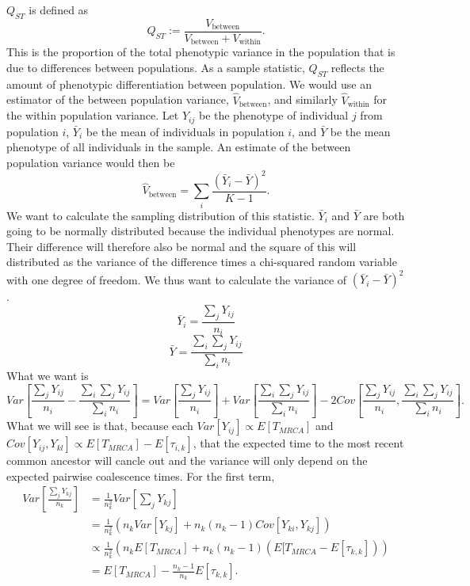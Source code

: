 $Q_{ST}$ is defined as 
\begin{equation}
  \label{eq:qst}
  Q_{ST} := \frac{V_{\text{between}}}{V_{\text{between}} + V_{\text{within}}}.
\end{equation}
This is the proportion of the total phenotypic variance in the population that is due to differences between
populations. As a sample statistic, $Q_{ST}$ reflects the amount of phenotypic differentiation between population. We
would use an estimator of the between population variance, $\hat{V}_{\text{between}}$, and similarly
$\hat{V}_{\text{within}}$ for the within population variance. Let $Y_{ij}$ be the phenotype of individual $j$ from
population $i$, $\bar{Y}_i$ be the mean of individuals in population $i$, and $\bar{Y}$ be the mean phenotype of all
individuals in the sample. An estimate of the between population variance would then be
\begin{equation}
  \label{eq:between}
  \hat{V}_{\text{between}} = \sum_i \frac{(\bar{Y}_i-\bar{Y})^2}{K-1}.
\end{equation}
We want to calculate the sampling distribution of this statistic. $\bar{Y}_i$ and $\bar{Y}$ are both going to be
normally distributed because the individual phenotypes are normal. Their difference will therefore also be normal and
the square of this will distributed as the variance of the difference times a chi-squared random variable with one
degree of freedom. We thus want to calculate the variance of $(\bar{Y}_i-\bar{Y})^2$. 
\begin{equation}
  \label{eq:popmean}
  \bar{Y}_i = \frac{\sum_jY_{ij}}{n_i}
\end{equation}
\begin{equation}
  \label{eq:grandmean}
  \bar{Y} = \frac{\sum_i\sum_jY_{ij}}{\sum_in_i}
\end{equation}
What we want is
\begin{equation}
  \label{eq:varexpand}
  Var[\frac{\sum_jY_{ij}}{n_i} - \frac{\sum_i\sum_jY_{ij}}{\sum_in_i}] = 
  Var[\frac{\sum_jY_{ij}}{n_i}] + Var[\frac{\sum_i\sum_jY_{ij}}{\sum_in_i}] - 2 Cov[\frac{\sum_jY_{ij}}{n_i}, \frac{\sum_i\sum_jY_{ij}}{\sum_in_i}].
\end{equation}
What we will see is that, because each $Var[Y_{ij}] \propto E[T_{MRCA}]$ and
$Cov[Y_{ij},Y_{kl}] \propto E[T_{MRCA}] - E[\tau_{i,k}]$, that the expected time to the most recent common ancestor will
cancle out and the variance will only depend on the expected pairwise coalescence times. For the first term,
\begin{align}
  Var[\frac{\sum_jY_{kj}}{n_k}] &= \frac{1}{n_k^2}Var[\sum_j Y_{kj}] \nonumber \\
                                &= \frac{1}{n_k^2} \left( n_k Var[Y_{kj}] + n_k(n_k-1) Cov[Y_{ki},Y_{kj}] \right) \nonumber \\
                                &\propto \frac{1}{n_k^2} \left( n_k E[T_{MRCA}] + n_k(n_k-1) (E[T_{MRCA}-E[\tau_{k,k}]) \right) \nonumber \\
                                &= E[T_{MRCA}] - \frac{n_k-1}{n_k}E[\tau_{k,k}].
\end{align}
